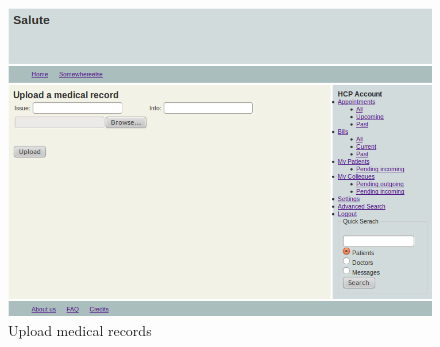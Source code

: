 \documentclass[10pt]{report}
\begin{document}
\begin{figure}
\includegraphics[scale=0.6]{screenshots/upload.png}
\caption{Upload medical records}
\end{figure}
\end{document}
